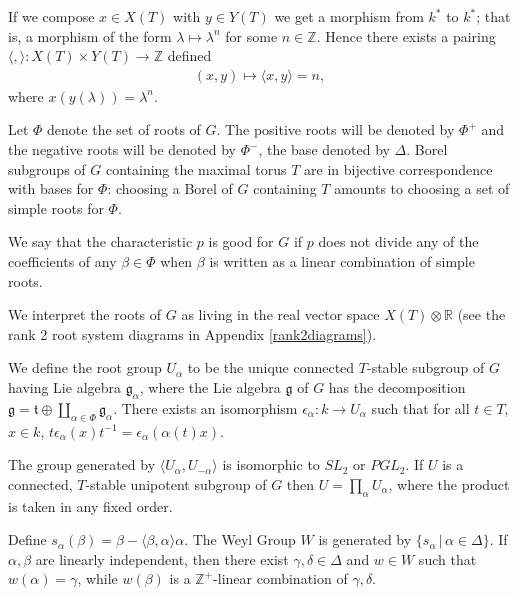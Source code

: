 If we compose $x\in X(T)$ with $y\in Y(T)$ we get a morphism from $k^*$ to $k^*$; that is, a morphism of the form $\lambda\mapsto \lambda^n$ for some $n\in \mathbb{Z}$. Hence there exists a pairing $\langle,\rangle:X(T)\times Y(T)\rightarrow \mathbb{Z}$ defined
\begin{align*}
	(x, y) \mapsto \langle x, y\rangle = n,
\end{align*}
where $x(y(\lambda)) = \lambda^n$. 

Let $\Phi$ denote the set of roots of $G$. The positive roots will be denoted by $\Phi^+$ and the negative roots will be denoted by $\Phi^-$, the base denoted by $\Delta$. Borel subgroups of $G$ containing the maximal torus $T$ are in bijective correspondence with bases for $\Phi$: choosing a Borel of $G$ containing $T$ amounts to choosing a set of simple roots for $\Phi$.

We say that the characteristic $p$ is good for $G$ if $p$ does not divide any of the coefficients of any $\beta\in\Phi$ when $\beta$ is written as a linear combination of simple roots.

We interpret the roots of $G$ as living in the real vector space $X(T)\otimes \mathbb{R}$ (see the rank 2 root system diagrams in Appendix \ref{rank2diagrams}).

We define the root group $U_\alpha$ to be the unique connected $T$-stable subgroup of $G$ having Lie algebra $\mathfrak{g}_\alpha$, where the Lie algebra $\mathfrak{g}$ of $G$ has the decomposition $\mathfrak{g} = \mathfrak{t} \oplus \coprod_{\alpha\in\Phi} \mathfrak{g}_\alpha$. There exists an isomorphism $\epsilon_\alpha: k \rightarrow U_\alpha$ such that for all $t\in T$, $x\in k$, $t\epsilon_\alpha(x)t^{-1} = \epsilon_\alpha(\alpha(t)x)$.

The group generated by $\langle U_\alpha, U_{-\alpha}\rangle$ is isomorphic to $SL_2$ or $PGL_2$. If $U$ is a connected, $T$-stable unipotent subgroup of $G$ then $U=\prod_\alpha U_\alpha$, where the product is taken in any fixed order.

Define $s_\alpha(\beta)= \beta -\langle \beta,\alpha\rangle\alpha$. The Weyl Group $W$ is generated by $\{s_\alpha\,|\,\alpha\in \Delta\}$. If $\alpha,\beta$ are linearly independent, then there exist $\gamma,\delta\in \Delta$ and $w\in W$ such that $w(\alpha) = \gamma$, while $w(\beta)$ is a $\mathbb{Z}^+$-linear combination of $\gamma, \delta$.

